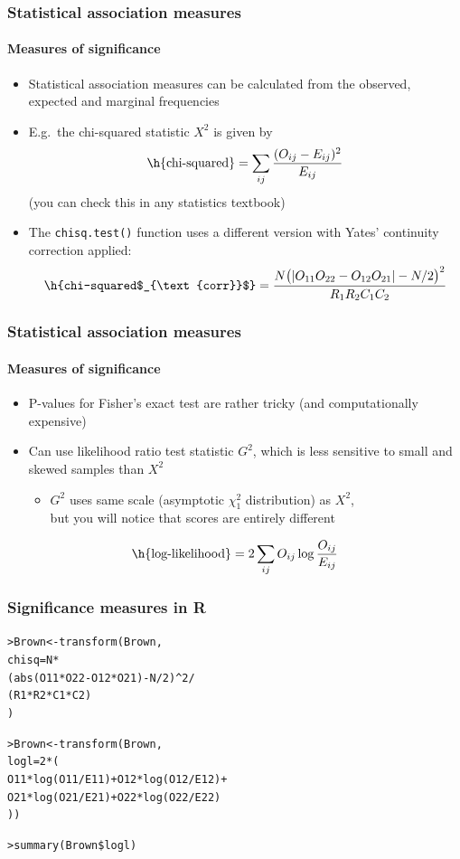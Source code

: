 \documentclass[t]{beamer} %
\begin{document}
\begin{frame}
  \frametitle{Statistical association measures}
  \framesubtitle{Measures of significance}

  \begin{itemize}
  \item Statistical association measures can be calculated from the observed,
    expected and marginal frequencies%
    \pause
  \item E.g.\ the chi-squared statistic $X^2$ is given by
    \[
    \text{\h{chi-squared}} =
    \sum_{ij} \frac{(O_{ij} - E_{ij})^2}{E_{ij}}
    \]
    (you can check this in any statistics textbook)%
    \pause
  \item The \texttt{chisq.test()} function uses a different version with
    Yates' continuity correction applied:
    \[
    \text{\h{chi-squared$_{\text{corr}}$}} =
    \frac{
      N \bigl( | O_{11}O_{22} - O_{12} O_{21} | - N/2 \bigr)^2
    }{
      R_1 R_2 C_1 C_2
    }
    \]
  \end{itemize}
\end{frame}

\begin{frame}
  \frametitle{Statistical association measures}
  \framesubtitle{Measures of significance}

  \begin{itemize}
  \item P-values for Fisher's exact test are rather tricky (and
    computationally expensive)
  \item Can use likelihood ratio test statistic $G^2$, which is less sensitive
    to small and skewed samples than $X^2$\\
    \citep{Dunning:93,Dunning:98,Evert:04phd}
    \begin{itemize}
    \item $G^2$ uses same scale (asymptotic $\chi^2_1$ distribution) as $X^2$,\\
      but you will notice that scores are entirely different
    \end{itemize}
  \end{itemize}
  \vspace{5mm}
  \[
  \text{\h{log-likelihood}} =
  2 \sum_{ij} O_{ij} \log {\frac {O_{ij}}{E_{ij}}}
  \]
\end{frame}

\begin{frame}[fragile]
  \frametitle{Significance measures in R}

  \begin{alltt}
> Brown <- transform(Brown,
    chisq = N *
    (abs(O11*O22 - O12*O21) - N/2)^2 /
    (R1 * R2 * C1 * C2)
  )

\pause
> Brown <- transform(Brown,
  logl = 2 * (
    O11*log(O11/E11) + O12*log(O12/E12) +
    O21*log(O21/E21) + O22*log(O22/E22)
  ))

> summary(Brown\$logl)  
  \end{alltt}
\end{frame}
\end{document}
